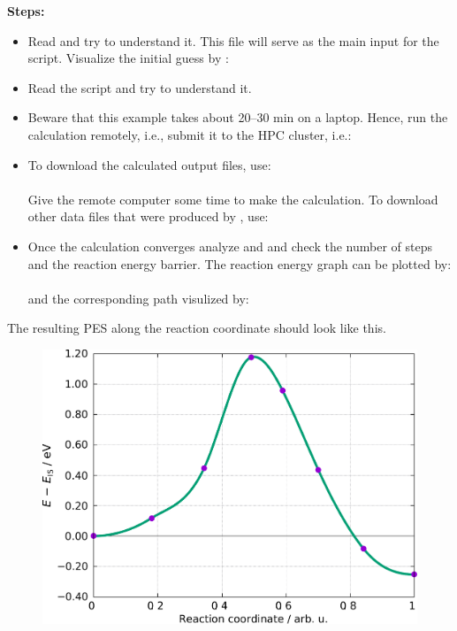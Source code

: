 \documentclass[landscape]{foils}
\begin{document}
{\bf{Steps:}}
\begin{itemize}
\item{Read  and try to understand
    it.
    This file will serve as the main input for the  script. Visualize the initial guess by :\\
    }
\item{Read the  script and try to understand it. }
\item{Beware that this example takes about 20--30 min on a
    laptop. Hence, run the calculation remotely, i.e., submit it to
    the HPC cluster, i.e.:\\
    }
\item To download the calculated output files, use:\\
  \\[0.5em]  
  Give the remote computer some time to make the calculation. To
  download other data files that were produced by , use:\\[0.5em]
\item{Once the calculation converges analyze  and
     and check the number of steps and the reaction
    energy barrier.
    The reaction energy graph can be plotted by:\\
     \\[0.5em]
    and the corresponding path visulized by: \\
     }
\end{itemize}

\clearpage

\vspace*{1em}
The resulting PES along the reaction coordinate should look like this.

\vspace*{1em}
\begin{figure}
  \centering
    \includegraphics[width=14.cm]{figs/NEB-H2onAl100-results.pdf}
\end{figure}
\end{document}
